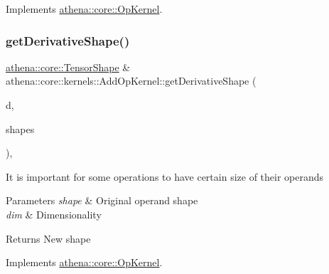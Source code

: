 Implements \mbox{\hyperlink{classathena_1_1core_1_1_op_kernel_ad500db1afc5a7c10acff8ecb8f1bee4d}{athena\+::core\+::\+Op\+Kernel}}.

\mbox{\label{classathena_1_1core_1_1kernels_1_1_add_op_kernel_a240d13047b8fd7676bf1f9d2bc94298f}} 
\subsubsection{\texorpdfstring{get\+Derivative\+Shape()}{getDerivativeShape()}}
{\footnotesize\ttfamily \mbox{\hyperlink{classathena_1_1core_1_1_tensor_shape}{athena\+::core\+::\+Tensor\+Shape}} \& athena\+::core\+::kernels\+::\+Add\+Op\+Kernel\+::get\+Derivative\+Shape (\begin{DoxyParamCaption}\item[{int}]{d,  }\item[{std\+::vector$<$ \mbox{\hyperlink{classathena_1_1core_1_1_tensor_shape}{athena\+::core\+::\+Tensor\+Shape}} $>$ \&}]{shapes }\end{DoxyParamCaption})\hspace{0.3cm}{\ttfamily [override]}, {\ttfamily [virtual]}}

It is important for some operations to have certain size of their operands 
\begin{DoxyParams}{Parameters}
{\em shape} & Original operand shape \\
\hline
{\em dim} & Dimensionality \\
\hline
\end{DoxyParams}
\begin{DoxyReturn}{Returns}
New shape 
\end{DoxyReturn}


Implements \mbox{\hyperlink{classathena_1_1core_1_1_op_kernel_ad95af6dd184ce7ee9182ec7ca54b6c4d}{athena\+::core\+::\+Op\+Kernel}}.

\mbox{\label{classathena_1_1core_1_1kernels_1_1_add_op_kernel_a296a0c69a7b906037324cce2b64827e1}} 
